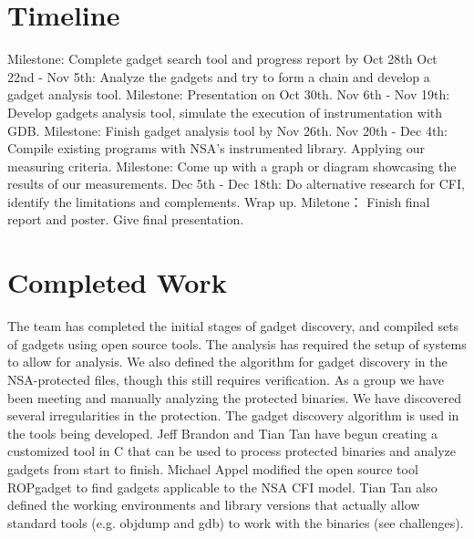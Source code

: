 \documentclass[letterpaper,10pt]{article}
\begin{document}
\section{Timeline}
Milestone: Complete gadget search tool and progress report by Oct 28th
\newline\indent
Oct 22nd - Nov 5th: Analyze the gadgets and try to form a chain and develop a gadget analysis tool.
\newline\indent\indent
Milestone: Presentation on Oct 30th.
\newline\indent
Nov 6th - Nov 19th: Develop gadgets analysis tool, simulate the execution of instrumentation with GDB.
\newline\indent\indent
Milestone: Finish gadget analysis tool by Nov 26th.
\newline\indent
Nov 20th - Dec 4th: Compile existing programs with NSA's instrumented library. Applying our measuring criteria.
\newline\indent\indent
Milestone: Come up with a graph or diagram showcasing the results of our measurements.
\newline\indent
Dec 5th - Dec 18th: Do alternative research for CFI, identify the limitations and complements. Wrap up.
\newline\indent\indent
Miletone： Finish final report and poster. Give final presentation.
    
\section{Completed Work}

The team has completed the initial stages of gadget discovery, and compiled sets of gadgets using open source tools. The analysis has required the setup of systems to allow for analysis. We also defined the algorithm for gadget discovery in the NSA-protected files, though this still requires verification. As a group we have been meeting and manually analyzing the protected binaries. We have discovered several irregularities in the protection.
	The gadget discovery algorithm is used in the tools being developed. Jeff Brandon and Tian Tan have begun creating a customized tool in C that can be used to process protected binaries and analyze gadgets from start to finish. Michael Appel modified the open source tool ROPgadget to find gadgets applicable to the NSA CFI model. Tian Tan also defined the working environments and library versions that actually allow standard tools (e.g. objdump and gdb) to work with the binaries (see challenges).
\end{document}
